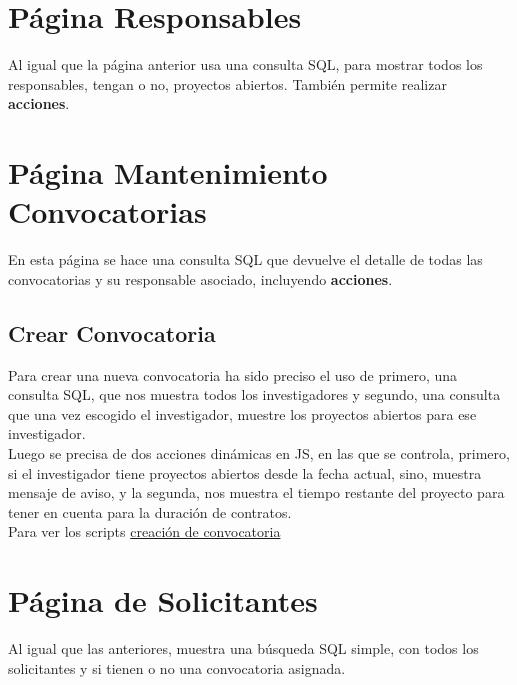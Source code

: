 \section{Página Responsables}
Al igual que la página anterior usa una consulta \acrshort{SQL}, para mostrar todos los responsables, tengan o no, proyectos abiertos. También permite realizar \textbf{acciones}. 

\section{Página Mantenimiento Convocatorias}
En esta página se hace una consulta \acrshort{SQL} que devuelve el detalle de todas las convocatorias y su responsable asociado, incluyendo \textbf{acciones}.
\subsection{Crear Convocatoria}
Para crear una nueva convocatoria ha sido preciso el uso de primero, una consulta \acrshort{SQL}, que nos muestra todos los investigadores y segundo, una consulta que una vez escogido el investigador, muestre los proyectos abiertos para ese investigador.\\
Luego se precisa de dos acciones dinámicas en \acrshort{JS}, en las que se controla, primero, si el investigador tiene proyectos abiertos desde la fecha actual, sino, muestra mensaje de aviso, y la segunda, nos muestra el tiempo restante del proyecto para tener en cuenta para la duración de contratos.\\ 
Para ver los scripts \href{https://github.com/far0010/TFGUBU-Fran_Arroyo/blob/main/project-docs/memoria/sql/scrips_crear_convo.js}{creación de convocatoria}


\section{Página de Solicitantes}
Al igual que las anteriores, muestra una búsqueda \acrshort{SQL} simple, con todos los solicitantes y si tienen o no una convocatoria asignada. 
